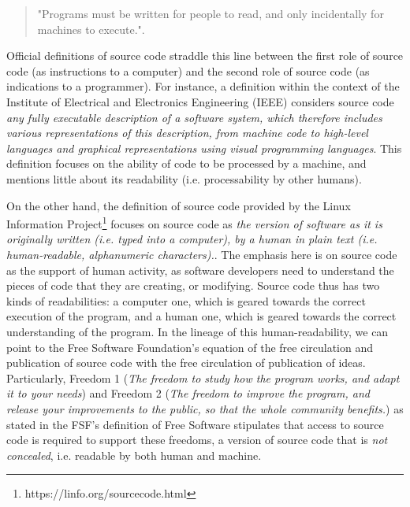 \begin{quotation}
    "Programs must be written for people to read, and only incidentally for machines to execute."\cite{abelson_structure_1979}.    
\end{quotation}


Official definitions of source code straddle this line between the first role of source code (as instructions to a computer) and the second role of source code (as indications to a programmer). For instance, a definition within the context of the Institute of Electrical and Electronics Engineering (IEEE) considers source code \emph{any fully executable description of a software system, which therefore includes various representations of this description, from machine code to high-level languages and graphical representations using visual programming languages}\cite{harman_why_2010}. This definition focuses on the ability of code to be processed by a machine, and mentions little about its readability (i.e. processability by other humans).

On the other hand, the definition of source code provided by the Linux Information Project\footnote{https://linfo.org/sourcecode.html} focuses on source code as \emph{the version of software as it is originally written (i.e. typed into a computer), by a human in plain text (i.e. human-readable, alphanumeric characters).}\cite{noauthor_source_nodate}. The emphasis here is on source code as the support of human activity, as software developers need to understand the pieces of code that they are creating, or modifying. Source code thus has two kinds of readabilities: a computer one, which is geared towards the correct execution of the program, and a human one, which is geared towards the correct understanding of the program. In the lineage of this human-readability, we can point to the Free Software Foundation's equation of the free circulation and publication of source code with the free circulation of publication of ideas. Particularly, Freedom 1 (\emph{The freedom to study how the program works, and adapt it to your needs}) and Freedom 2 (\emph{The freedom to improve the program, and release your improvements to the public, so that the whole community benefits.}) as stated in the FSF's definition of Free Software stipulates that access to source code is required to support these freedoms, a version of source code that is \emph{not concealed}, i.e. readable by both human and machine\cite{stallman_free_2002}.

